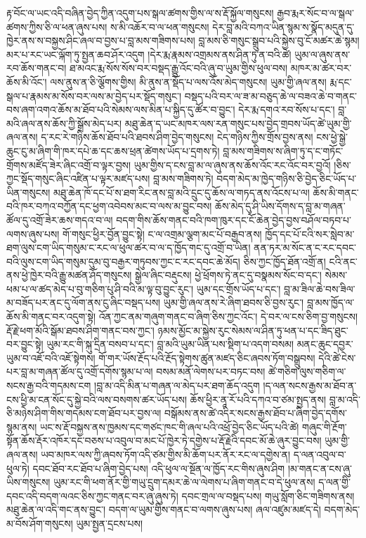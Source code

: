 \documentclass{article}
\begin{document}
རྟ་བོང་ལ་ཡང་འདི་བཞིན་བྱེད་ཀྱིན་འདུག་པས་སྒལ་ཚགས་གྱིས་ལ་ས་རྡོ་སྐྱོལ་གསུངས། རྒྱབ་རྨར་སོང་བ་ལ་སྒལ་ཚགས་ཀྱིས་ཅི་ལ་ཕན་ཞུས་པས། ས་མི་འཆོར་བ་ལ་ཕན་གསུངས། དེར་བླ་མའི་བཀའ་ཡིན་སྙམ་ས་སྣོད་མདུན་དུ་ཁྱེར་ནས་ས་བསྐྱས་ཤིང་ཞལ་བ་བྱས་པ་བླ་མས་གཟིགས་པས། བླ་མས་ཅི་གསུང་སྒྲུབ་པའི་སྐྱེས་བུ་ངོ་མཚར་ཆེ་སྙམ། མར་པ་རང་ཡང་ལྐོག་ཏུ་སྤྱན་ཆབ་ཤོར་འདུག །དེར་རྨ་རྣམས་འགྲམས་ནས་ཤིན་ཏུ་ན་བའི་ཚེ། ཡུམ་ལ་ཞུས་ནས་རབ་ཆོས་གནང་བ། ཐ་མའང་རྨ་སོས་སོས་བར་བསྡད་རྒྱུ་འོང་བའི་ཞུ་བ་ཡུམ་གྱིས་ཕུལ་བས། མཁར་མ་ཚར་བར་ཆོས་མི་འོང་། ལས་ནུས་ན་ཅི་ལྕོགས་གྱིས། མི་ནུས་ན་སྡོད་པ་ལས་འོས་མེད་གསུངས། ཡུམ་གྱི་ཞལ་ནས། རྨ་དང་སྒལ་པ་རྣམས་མ་སོས་བར་ལས་མ་བྱེད་པར་སྡོད་གསུང་། བསྡད་པའི་བར་ལ་ཟ་མ་བཅུད་ཆེ་ལ་བཟའ་ཆེ་བ་གནང་བས་ཞག་འགའ་ཆོས་མ་ཐོབ་པའི་སེམས་ལས་མིན་པ་སྐྱིད་དུ་ཚོར་བ་བྱུང་། དེར་རྨ་དགའ་རབ་སོས་པ་དང་། བླ་མའི་ཞལ་ནས་ཆོས་ཀྱི་སྒྲོས་མེད་པར། མཐུ་ཆེན་ད་ཡང་མཁར་ལས་རན་གསུང་པས་བྱེད་གྲབས་ཡོད་ཚེ་ཡུམ་གྱི་ཞལ་ནས། ད་རང་རེ་གཉིས་ཆོས་ཐོབ་པའི་ཐབས་ཤིག་བྱེད་གསུངས། ངེད་གཉིས་ཀྱིས་གྲོས་བྱས་ནས། ངས་ཕྱེ་སྒྱེ་ཆུང་ངུ་མ་ཞིག་གི་ཁར་དཔེ་ཆ་དང་ཆས་ཕྲན་ཚེགས་ཡོད་པ་དྲགས་ཏེ། བླ་མས་གཟིགས་ས་ཞིག་ཏུ་ད་ང་གཏོང་གྲོགས་མཛོད་ཟེར་ཞིང་འགྲོ་བ་ལྟར་བྱས། ཡུམ་གྱིས་ད་ངས་བླ་མ་ལ་ཞུས་ནས་ཆོས་འོང་རང་འོང་བར་བྱའོ། །ཅིས་ཀྱང་སྡོད་གསུང་ཞིང་འཛིན་པ་ལྟར་མཛད་པས། བླ་མས་གཟིགས་ཏེ། བདག་མེད་མ་ཁྱེད་གཉིས་ཅི་བྱེད་ཅིང་ཡོད་པ་ཡིན་གསུངས། མཐུ་ཆེན་ཁོ་དང་པོ་ས་ཐག་རིང་ནས་བླ་མའི་དྲུང་དུ་ཆོས་ལ་གཏད་ནས་འོངས་པ་ལ། ཆོས་མི་གནང་བའི་ཁར་བཀའ་བཀྱོན་དང་ཕྱག་འབེབས་མང་བ་ལས་མ་བྱུང་བས། ཆོས་མེད་དུ་ཤི་ཡིས་དོགས་ད་བླ་མ་གཞན་ཚོལ་དུ་འགྲོ་ཟེར་ཆས་གདའ་བ་ལ། བདག་གིས་ཆོས་གནང་བའི་ཁག་ཁུར་དང་ངོ་ཆེན་བྱེད་བྱས་བཤོལ་བཏབ་པ་ལགས་ཞུས་པས། གོ་གསུང་ཕྱིར་བྱོན་བྱུང་སྟེ། ང་ལ་འགྲམ་ལྕག་མང་པོ་བརྒྱབ་ནས། ཁྱོད་དང་པོ་ངའི་སར་སླེབ་མ་ཐག་ལུས་ངག་ཡིད་གསུམ་ང་རང་ལ་ཕུལ་ཚར་བ་ལ་ད་ཁྱོད་གང་དུ་འགྲོ་བ་ཡིན། ནན་ཏར་མ་སོང་ན་ང་རང་དབང་བའི་ལུས་ངག་ཡིད་གསུམ་དུམ་བུ་བརྒྱར་གཏུབས་ཀྱང་ང་རང་དབང་ཆེ་མོད། ཅིས་ཀྱང་ཁྱོད་ཐོན་འགྲོ་ན། ངའི་ནང་ནས་ཕྱེ་ཁྱེར་བའི་རྒྱུ་མཚན་ཤོད་གསུངས། སྒྱེལ་ཞིང་བརྡུངས། ཕྱེ་ཕྲོགས་ཏེ་ནང་དུ་བསྣམས་སོང་བ་དང་། སེམས་ཕམ་པ་ལ་ཚད་མེད་པ་བུ་གཅིག་པུ་ཤི་བའི་མ་ལྟ་བུ་བྱུང་རུང་། ཡུམ་དང་གྲོས་ཡོད་པ་དང་། བླ་མ་ཟིལ་ཆེ་བས་ཟིལ་མ་བཟོད་པར་ནང་དུ་ལོག་ནས་ངུ་ཞིང་བསྡད་པས། ཡུམ་གྱི་ཞལ་ནས་རེ་ཞིག་ཐབས་ཅི་བྱས་རུང་། བླ་མས་ཁྱོད་ལ་ཆོས་མི་གནང་བར་འདུག་སྟེ། འོན་ཀྱང་ནམ་གཞུག་གནང་བ་ཞིག་ཅིས་ཀྱང་འོང་། དེ་བར་ལ་ངས་ཅིག་བྱ་གསུངས། རྡོ་རྗེ་ཕག་མོའི་སྒོམ་ཐབས་ཤིག་གནང་བས་ཀྱང་། ཉམས་མྱོང་མ་སྐྱེས་རུང་སེམས་ལ་ཤིན་ཏུ་ཕན་པ་དང་ཟིད་ཐུང་བར་བྱུང་སྟེ། ཡུམ་རང་གི་སྐུ་དྲིན་བསབ་པ་དང་། བླ་མའི་ཡུམ་ཡིན་པས་སྡིག་པ་འདག་བསམ། མནང་ཆུང་དབྱར་ཡུམ་བ་འཇོ་བའི་འཇོ་སྟེགས། གོ་གར་ཡོས་རྔོད་པའི་རྔོད་སྟེགས་ཚུན་མཛད་ཅིང་ཞབས་ཏོག་བསྒྲུབས། དེའི་ཚེ་ངེས་པར་བླ་མ་གཞན་ཚོལ་དུ་འགྲོ་དགོས་སྙམ་པ་ལ། བསམ་མནོ་ལེགས་པར་བཏང་བས། ཚེ་གཅིག་ལུས་གཅིག་ལ་སངས་རྒྱ་བའི་གདམས་ངག །བླ་མ་འདི་མིན་པ་གཞན་ལ་མེད་པར་ཐག་ཆོད་འདུག །ད་ལན་སངས་རྒྱས་མ་ཐོབ་ན་ངས་ཕྱི་མ་ངན་སོང་དུ་སྐྱེ་བའི་ལས་བསགས་ཚར་ཡོད་པས། ཆོས་ཕྱིར་ནཱ་རོ་པའི་དཀའ་བ་ཙམ་སྤྱད་ནས། བླ་མ་འདི་ཅི་མཉེས་ཤིག་གིས་གདམས་ངག་ཐོབ་པར་བྱས་ལ། བསྒོམས་ནས་ཚེ་འདིར་སངས་རྒྱས་ཐོབ་པ་ཞིག་བྱེད་དགོས་སྙམ་ནས། ཡང་ས་རྡོ་བསྐྱས་ནས་ཁྱམས་དང་གཙང་ཁང་གི་ཞལ་པའི་འཕྲོ་བྱེད་ཅིང་ཡོད་པའི་ཚེ། གཞུང་གི་རྔོག་སྟོན་ཆོས་རྡོར་འཁོར་དང་བཅས་པ་འབུལ་བ་མང་པོ་ཁྱེར་ཏེ་དགྱེས་པ་རྡོ་རྗེའི་དབང་མོ་ཆེ་ཞུར་བྱུང་བས། ཡུམ་གྱི་ཞལ་ནས། ཡབ་མཁར་ལས་ཀྱི་ཞབས་ཏོག་འདི་ཙམ་གྱིས་མི་ཆོག་པར་ནོར་རང་ལ་དགྱེས་ན། ད་ལན་འབུལ་བ་ཕུལ་ཏེ། དབང་ཐོབ་རང་ཐོབ་པ་ཞིག་བྱེད་པས། འདི་ཕུལ་ལ་སྔོན་ལ་ཁྱོད་རང་གིས་ཞུས་ཤིག །མ་གནང་ན་ངས་ཞུ་ཡིས་གསུངས། ཡུམ་རང་གི་ཕག་ནོར་གྱི་གཡུ་དྲུག་དམར་ཆེ་ལ་ལེགས་པ་ཞིག་གནང་བ་དེ་ཕུལ་ནས། ད་ལན་གྱི་དབང་འདི་བདག་ལའང་ཅིས་ཀྱང་གནང་བར་ཞུ་ཞུས་ཏེ། དབང་གྲལ་ལ་བསྡད་པས། གཡུ་སློག་ཅིང་གཟིགས་ནས། མཐུ་ཆེན་ལ་འདི་གང་ནས་བྱུང་། བདག་ལ་ཡུམ་གྱིས་གནང་བ་ལགས་ཞུས་པས། ཞལ་འཛུམ་མཛད་དེ། བདག་མེད་མ་བོས་ཤོག་གསུངས། ཡུམ་སྤྱན་དྲངས་པས། 
\end{document}
